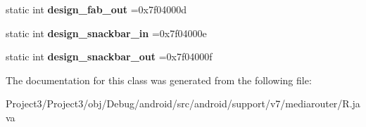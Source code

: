 \begin{DoxyCompactItemize}
static int {\bfseries design\+\_\+fab\+\_\+out} =0x7f04000d
\item 
\mbox{\label{classandroid_1_1support_1_1v7_1_1mediarouter_1_1R_1_1anim_aa6b624f748e4590d9bc5ee5da5d9e3ee}} 
static int {\bfseries design\+\_\+snackbar\+\_\+in} =0x7f04000e
\item 
\mbox{\label{classandroid_1_1support_1_1v7_1_1mediarouter_1_1R_1_1anim_a95589134aa526fc9571705fbb2183191}} 
static int {\bfseries design\+\_\+snackbar\+\_\+out} =0x7f04000f
\end{DoxyCompactItemize}


The documentation for this class was generated from the following file\+:\begin{DoxyCompactItemize}
\item 
Project3/\+Project3/obj/\+Debug/android/src/android/support/v7/mediarouter/R.\+java\end{DoxyCompactItemize}
